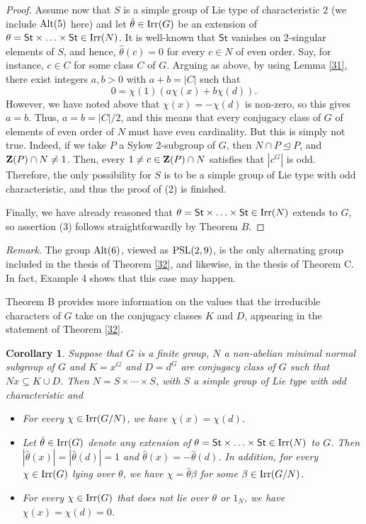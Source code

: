 \documentclass[12pt,leqno,a4paper]{amsart}
\newtheorem{corollary}[theorem]{Corollary}
\numberwithin{equation}{section}
\begin{document}
\begin{proof}
\medskip
Assume now that $S$ is a simple group of Lie type of characteristic $2$  (we include ${\rm Alt}(5)$ here) and let  $\hat{\theta}\in {\rm Irr}(G)$ be an extension of $\theta= \mathsf{St}\times \ldots \times \mathsf{St}\in {\rm Irr}(N)$. It is well-known that $\mathsf{St}$ vanishes on $2$-singular elements of $S$, and hence, $\hat{\theta}(c)=0$ for every $c\in N$ of even order. Say, for instance,  $c\in C$ for some class $C$ of $G$.  Arguing as above, by using Lemma \ref{31}, there exist integers $a,b>0$ with $a+b= |C|$ such that
$$0=\chi(1)(a\chi(x)+ b\chi(d)).$$
However, we have noted above that $\chi(x)=-\chi(d)$ is non-zero, so this gives $a=b$. Thus, $a=b=|C|/2$, and this means that every conjugacy class of $G$ of elements of even order of $N$ must have even cardinality. But this is simply not true. Indeed, if we take $P$ a Sylow 2-subgroup of $G$, then $N\cap P\unlhd P$, and  ${\bf Z}(P)\cap N\neq 1$. Then,  every $1\neq c\in {\bf Z}(P)\cap N$ satisfies that $|c^G|$ is odd.
 Therefore, the only possibility for $S$ is to be a simple group of Lie type with odd characteristic, and thus the proof of (2) is finished.



\medskip
Finally, we have already reasoned that   $\theta= \mathsf{St}\times \ldots \times \mathsf{St}\in {\rm Irr}(N)$ extends to $G$, so  assertion (3) follows straightforwardly by Theorem $B$.
\end{proof}

\noindent
{\it Remark}. The group ${\rm Alt}(6)$, viewed as ${\rm PSL}(2,9)$, is the only alternating group included in the thesis of Theorem \ref{32}, and likewise, in the thesis of Theorem C. In fact, Example 4 shows that this case may happen.
 
\medskip
Theorem B provides more information on the values that the irreducible characters of $G$ take on the conjugacy classes $K$ and $D$, appearing in the statement of Theorem \ref{32}.


\begin{corollary}\label{33}
Suppose that $G$ is a finite group, $N$  a non-abelian minimal normal subgroup of $G$ and $K=x^G$ and $D=d^G$ are conjugacy class of $G$ such that $Nx\subseteq K\cup  D$. Then $N=S\times\cdots\times S$, with $S$ a simple group of Lie type with odd characteristic and

  \begin{itemize}
  \item[(a)]  For every $\chi\in {\rm Irr}(G/N)$, we have $\chi(x)=\chi(d)$.
  \item[(b)] Let $\hat{\theta}\in {\rm Irr}(G)$ denote any extension of  $\theta= \mathsf{St}\times \ldots \times \mathsf{St}\in {\rm Irr}(N)$  to $G$.  Then $|\hat{\theta}(x)|= |\hat{\theta}(d)|=1$ and $\hat{\theta}(x)=- \hat{\theta}(d)$. In addition, for every $\chi\in {\rm Irr}(G)$ lying over $\theta$, we have $\chi=\hat{\theta}\beta$
 for some $\beta\in {\rm Irr}(G/N)$.
  \item[(c)]  For every $\chi\in {\rm Irr}(G)$ that does not lie over $\theta$ or $1_N$, we have $\chi(x)=\chi(d)=0$.
\end{itemize}
\end{corollary}
\end{document}
